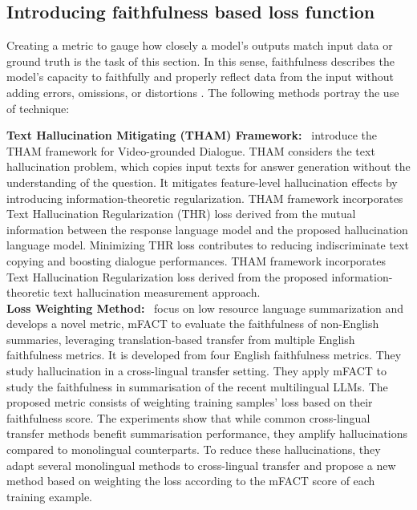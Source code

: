 \documentclass[11pt]{article}
\begin{document}
\subsection{Introducing faithfulness based loss function}
\label{subsubsec:Introducing faithfulness based loss function}
Creating a metric to gauge how closely a model's outputs match input data or ground truth is the task of this section. In this sense, faithfulness describes the model's capacity to faithfully and properly reflect data from the input without adding errors, omissions, or distortions \cite{chrysostomou2021enjoy}. The following methods portray the use of technique: 

\textbf{Text Hallucination Mitigating (THAM) Framework:}~\cite{yoon-etal-2022-information} introduce the THAM framework for Video-grounded Dialogue. THAM considers the text hallucination problem, which copies
input texts for answer generation without the understanding of the question. It mitigates feature-level hallucination effects
by introducing information-theoretic regularization. THAM framework incorporates Text Hallucination Regularization (THR) loss derived from the mutual information between the response language model and the proposed hallucination language model. Minimizing THR loss contributes to reducing indiscriminate text copying and boosting dialogue performances.
THAM framework incorporates Text Hallucination Regularization loss derived from the proposed information-theoretic text
hallucination measurement approach. \\
\textbf{Loss Weighting Method:}~\cite{qiu2023detecting} focus on low resource language summarization and develops a novel metric, mFACT to evaluate the faithfulness of non-English summaries, leveraging translation-based transfer from multiple English faithfulness metrics. It is developed from four English faithfulness metrics. They study hallucination in a cross-lingual transfer setting. They apply mFACT to study the faithfulness in summarisation of the recent multilingual LLMs. The proposed metric consists of weighting
training samples’ loss based on their faithfulness
score. The experiments show that while common cross-lingual transfer methods benefit summarisation performance, they amplify hallucinations compared to monolingual counterparts. To reduce these hallucinations, they adapt several monolingual methods to cross-lingual transfer and propose a new method based on
weighting the loss according to the mFACT score of each training example.
\end{document}
